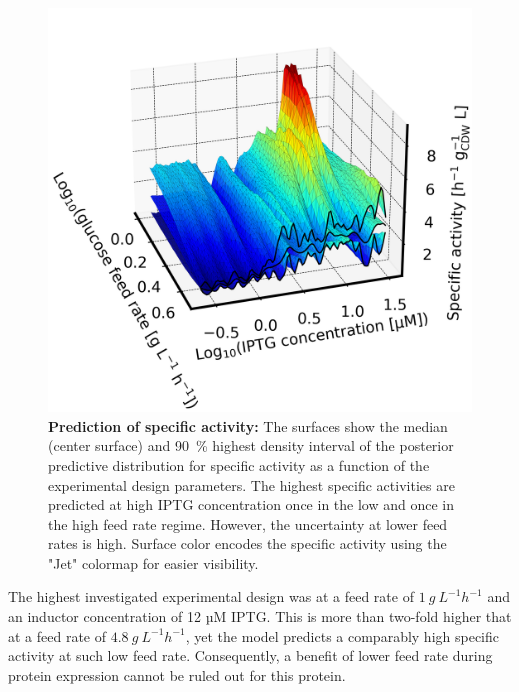 \documentclass[sn-standardnature]{sn-jnl}%
\theoremstyle{thmstyleone}%
\theoremstyle{thmstyletwo}%
\theoremstyle{thmstylethree}%
\begin{document}
\begin{figure}[H]
    \centering
    \includegraphics[width=1.0\textwidth]{figures/plot_3d_pp_dense_s_design.png}
    \caption{
        \textbf{Prediction of specific activity:}
        The surfaces show the median (center surface) and 90~\% highest density interval of the posterior predictive distribution for specific activity as a function of the experimental design parameters.
        The highest specific activities are predicted at high IPTG concentration once in the low and once in the high feed rate regime.
        However, the uncertainty at lower feed rates is high.
        Surface color encodes the specific activity using the "Jet" colormap \cite{matplotlibDocs} for easier visibility.
    }
    \label{fig_3Dsdesign}
\end{figure}


The highest investigated experimental design was at a feed rate of $1\ g\ L^{-1} h^{-1}$ and an inductor concentration of 12 µM IPTG.
This is more than two-fold higher that at a feed rate of $4.8\ g\ L^{-1} h^{-1}$, yet the model predicts a comparably high specific activity at such low feed rate.
Consequently, a benefit of lower feed rate during protein expression cannot be ruled out for this protein.
\end{document}
